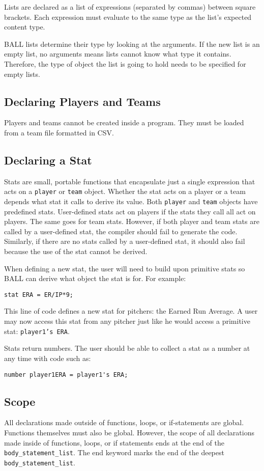 Lists are declared as a list of expressions (separated by commas)
between square brackets. Each expression must evaluate to the same
type as the list's expected content type.

BALL lists determine their type by looking at the arguments. If the
new list is an empty list, no arguments means lists cannot know what
type it contains. Therefore, the type of object the list is going to
hold needs to be specified for empty lists.

\subsection{Declaring Players and Teams}

Players and teams cannot be created inside a program. They must be
loaded from a team file formatted in CSV.

\subsection{Declaring a Stat}

Stats are small, portable functions that encapsulate just a single
expression that acts on a \texttt{player} or \texttt{team}
object. Whether the stat acts on a player or a team depends what stat
it calls to derive its value. Both \texttt{player} and \texttt{team}
objects have predefined stats. User-defined stats act on players if
the stats they call all act on players. The same goes for team
stats. However, if both player and team stats are called by a
user-defined stat, the compiler should fail to generate the
code. Similarly, if there are no stats called by a user-defined stat,
it should also fail because the use of the stat cannot be derived.


When defining a new stat, the user will need to build upon primitive
stats so BALL can derive what object the stat is for. For example:

\begin{verbatim}
stat ERA = ER/IP*9;
\end{verbatim}

This line of code defines a new stat for pitchers: the Earned Run
Average. A user may now access this 
stat from any pitcher just like he would access a primitive stat:
\texttt{player1's ERA}.

Stats return numbers. The user should be able to collect a stat as
a number at any time with code such as: 

\begin{verbatim}
number player1ERA = player1's ERA;
\end{verbatim}

\subsection{Scope}
All declarations made outside of functions, loops, or if-statements
are global. Functions themselves must also be global. However, the
scope of all declarations made inside of functions, loops, or if
statements ends at the end of the \texttt{body\_statement\_list}. The
end keyword marks the end of the deepest
\texttt{body\_statement\_list}.
